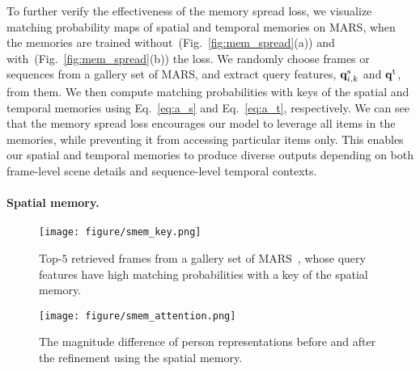 \documentclass[10pt,twocolumn,letterpaper]{article}
\begin{document}
			To further verify the effectiveness of the memory spread loss, we visualize matching probability maps of spatial and temporal memories on MARS, when the memories are trained without~(Fig.~\ref{fig:mem_spread}(a)) and with~(Fig.~\ref{fig:mem_spread}(b)) the loss. We randomly choose frames or sequences from a gallery set of MARS, and extract query features, $\mathbf{q}^{\text s}_{i,k}$ and $\mathbf{q}^{\text t}$, from them. We then compute matching probabilities with keys of the spatial and temporal memories using Eq.~\eqref{eq:a_s} and Eq.~\eqref{eq:a_t}, respectively. We can see that the memory spread loss encourages our model to leverage all items in the memories, while preventing it from accessing particular items only. This enables our spatial and temporal memories to produce diverse outputs depending on both frame-level scene details and sequence-level temporal contexts.
			
		\vspace{-0.5cm}
		\paragraph{Spatial memory.}
		
		
		\begin{figure}[t]
			\begin{minipage}{0.25\textwidth}
				\centering
				\texttt{[image: figure/smem\_key.png]}
				\caption{Top-$5$ retrieved frames from a gallery set of MARS~\cite{zheng2016mars}, whose query features have high matching probabilities with a key of the spatial memory.}
			  	\label{fig:smem_key}
			\end{minipage}
			\begin{minipage}{0.22\textwidth}
				\centering
				\texttt{[image: figure/smem\_attention.png]}
				\caption{The magnitude difference of person representations before and after the refinement using the spatial memory.}
			  	\label{fig:smem_attention}
			\end{minipage}\hfill
		   \vspace{-0.2cm}
		\end{figure}
\end{document}
